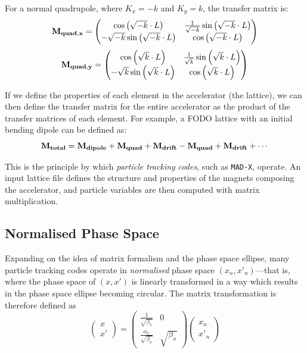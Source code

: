 \documentclass[11pt]{report}
\begin{document}
For a normal quadrupole, where $K_x=-k$ and $K_y=k$, the transfer matrix is:
\begin{equation}
  \bf{M}_{quad,x}=
  \begin{pmatrix}
    \cos\left(\sqrt{-k}\cdot L\right) & \frac1{\sqrt{-k}}\sin\left(\sqrt{-k}\cdot L\right) \\
    -\sqrt{-k}\sin\left(\sqrt{-k}\cdot L\right) & \cos\left(\sqrt{-k}\cdot L\right)
  \end{pmatrix}
\end{equation}
\begin{equation}
  \bf{M}_{quad,y}=
  \begin{pmatrix}
    \cos\left(\sqrt{k}\cdot L\right) & \frac1{\sqrt{k}}\sin\left(\sqrt{k}\cdot L\right) \\
    -\sqrt{k}\sin\left(\sqrt{k}\cdot L\right) & \cos\left(\sqrt{k}\cdot L\right)
  \end{pmatrix}
\end{equation}

If we define the properties of each element in the accelerator (the lattice), we can then define the transfer matrix for the entire accelerator as the product of the transfer matrices of each element. For example, a FODO lattice with an initial bending dipole can be defined as:
\begin{equation}
  \bf{M}_{total} = \bf{M}_{dipole} + \bf{M}_{quad} + \bf{M}_{drift} - \bf{M}_{quad} + \bf{M}_{drift} +\cdots
\end{equation}

This is the principle by which \textit{particle tracking codes}, such as \verb|MAD-X|, operate. An input lattice file defines the structure and properties of the magnets composing the accelerator, and particle variables are then computed with matrix multiplication. 

\subsection{Normalised Phase Space}\label{sec:normalised}

Expanding on the idea of matrix formalism and the phase space ellipse, many particle tracking codes operate in \textit{normalised} phase space $(x_n, x'_n)$---that is, where the phase space of $(x, x')$ is linearly transformed in a way which results in the phase space ellipse becoming circular. The matrix transformation is therefore defined as
\begin{equation}
  \begin{pmatrix}
    x \\
    x'
  \end{pmatrix} = 
  \begin{pmatrix}
    \frac{1}{\sqrt{\beta_x}} & 0 \\
    \frac{\alpha_x}{\sqrt{\beta_x}} & \sqrt{\beta_x}
  \end{pmatrix} \begin{pmatrix}
    x_n \\
    x'_n
  \end{pmatrix}
\end{equation}
\end{document}
